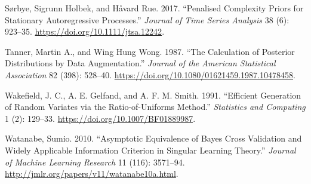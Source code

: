 \documentclass[
  11pt,
  letterpaper,
]{scrbook}
\newlength{\cslhangindent}
\newenvironment{CSLReferences}[2] %
 {\begin{list}{}{%
  \setlength{\itemindent}{0pt}
  \setlength{\leftmargin}{0pt}
  \setlength{\parsep}{0pt}
  \ifodd #1
   \setlength{\leftmargin}{\cslhangindent}
   \setlength{\itemindent}{-1\cslhangindent}
  \fi
  \setlength{\itemsep}{#2\baselineskip}}}
 {\end{list}}
\theoremstyle{definition}
\theoremstyle{plain}
\theoremstyle{plain}
\theoremstyle{definition}
\theoremstyle{definition}
\theoremstyle{remark}
\begin{document}
\begin{CSLReferences}{1}{0}
Sørbye, Sigrunn Holbek, and Håvard Rue. 2017. {``Penalised Complexity
Priors for Stationary Autoregressive Processes.''} \emph{Journal of Time
Series Analysis} 38 (6): 923--35.
\url{https://doi.org/10.1111/jtsa.12242}.

Tanner, Martin A., and Wing Hung Wong. 1987. {``The Calculation of
Posterior Distributions by Data Augmentation.''} \emph{Journal of the
American Statistical Association} 82 (398): 528--40.
\url{https://doi.org/10.1080/01621459.1987.10478458}.

Wakefield, J. C., A. E. Gelfand, and A. F. M. Smith. 1991. {``Efficient
Generation of Random Variates via the Ratio-of-Uniforms Method.''}
\emph{Statistics and Computing} 1 (2): 129--33.
\url{https://doi.org/10.1007/BF01889987}.

Watanabe, Sumio. 2010. {``Asymptotic Equivalence of {B}ayes Cross
Validation and Widely Applicable Information Criterion in Singular
Learning Theory.''} \emph{Journal of Machine Learning Research} 11
(116): 3571--94. \url{http://jmlr.org/papers/v11/watanabe10a.html}.

\end{CSLReferences}


\backmatter
\end{document}
